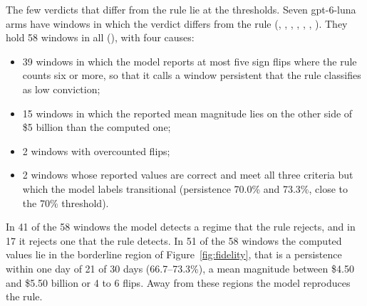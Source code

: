 The few verdicts that differ from the rule lie at the thresholds. Seven gpt-6-luna arms have windows in which the verdict differs from the rule (, , , , , , ). They hold 58 windows in all (), with four causes:
\begin{itemize}
\item 39 windows in which the model reports at most five sign flips where the rule counts six or more, so that it calls a window persistent that the rule classifies as low conviction;
\item 15 windows in which the reported mean magnitude lies on the other side of \$5 billion than the computed one;
\item 2 windows with overcounted flips;
\item 2 windows whose reported values are correct and meet all three criteria but which the model labels transitional (persistence 70.0\% and 73.3\%, close to the 70\% threshold).
\end{itemize}
In 41 of the 58 windows the model detects a regime that the rule rejects, and in 17 it rejects one that the rule detects. In 51 of the 58 windows the computed values lie in the borderline region of Figure~\ref{fig:fidelity}, that is a persistence within one day of 21 of 30 days (66.7--73.3\%), a mean magnitude between \$4.50 and \$5.50 billion or 4 to 6 flips. Away from these regions the model reproduces the rule.

